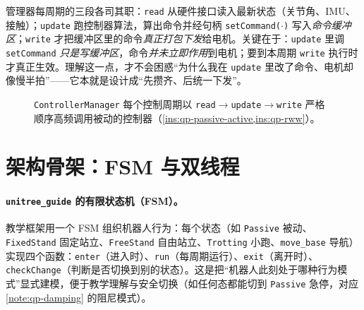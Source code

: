 \begin{insight}\label{ins:qp-rww}
管理器每周期的三段各司其职：\texttt{read} 从硬件接口读入最新状态（关节角、IMU、接触）；\texttt{update} 跑控制器算法，算出命令并经句柄 \texttt{setCommand($\cdot$)} 写入\emph{命令缓冲区}；\texttt{write} 才把缓冲区里的命令\emph{真正打包下发}给电机。关键在于：\texttt{update} 里调 \texttt{setCommand} \emph{只是写缓冲区}，命令\emph{并未立即作用}到电机；要到本周期 \texttt{write} 执行时才真正生效\cite{sleiman2021unified}。理解这一点，才不会困惑“为什么我在 \texttt{update} 里改了命令、电机却像慢半拍”——它本就是设计成“先攒齐、后统一下发”。
\end{insight}

\begin{figure}[ht]
\centering
{}
\caption{\texttt{ControllerManager} 每个控制周期以 \texttt{read}$\to$\texttt{update}$\to$\texttt{write} 严格顺序高频调用被动的控制器（\cref{ins:qp-passive-active,ins:qp-rww}）。}
\label{fig:qp-rww}
\end{figure}

\section{架构骨架：FSM 与双线程}
\label{sec:qp-fsm}

\paragraph{\texttt{unitree\_guide} 的有限状态机（FSM）。}
教学框架用一个 FSM 组织机器人行为：每个状态（如 \texttt{Passive} 被动、\texttt{FixedStand} 固定站立、\texttt{FreeStand} 自由站立、\texttt{Trotting} 小跑、\texttt{move\_base} 导航）实现四个函数：\texttt{enter}（进入时）、\texttt{run}（每周期运行）、\texttt{exit}（离开时）、\texttt{checkChange}（判断是否切换到别的状态）\cite{unitree2023quadruped}。这是把“机器人此刻处于哪种行为模式”显式建模，便于教学理解与安全切换（如任何态都能切到 \texttt{Passive} 急停，对应 \cref{note:qp-damping} 的阻尼模式）。

